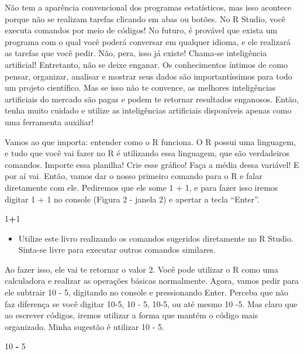 \documentclass[
]{book}
\newenvironment{Shaded}{\begin{snugshade}}{\end{snugshade}}
\newcommand{\DecValTok}[1]{\textcolor[rgb]{0.00,0.00,0.81}{#1}}
\newcommand{\SpecialCharTok}[1]{\textcolor[rgb]{0.81,0.36,0.00}{\textbf{#1}}}
\providecommand{\tightlist}{%
  \setlength{\itemsep}{0pt}\setlength{\parskip}{0pt}}
\begin{document}
Não tem a aparência convencional dos programas estatísticos, mas isso acontece porque não se realizam tarefas clicando em abas ou botões. No R Studio, você executa comandos por meio de códigos! No futuro, é provável que exista um programa com o qual você poderá conversar em qualquer idioma, e ele realizará as tarefas que você pedir. Não, pera, isso já existe! Chama-se inteligência artificial! Entretanto, não se deixe enganar. Os conhecimentos íntimos de como pensar, organizar, analisar e mostrar seus dados são importantíssimos para todo um projeto científico. Mas se isso não te convence, as melhores inteligências artificiais do mercado são pagas e podem te retornar resultados enganosos. Então, tenha muito cuidado e utilize as inteligências artificiais disponíveis apenas como uma ferramenta auxiliar!

Vamos ao que importa: entender como o R funciona. O R possui uma linguagem, e tudo que você vai fazer no R é utilizando essa linguagem, que são verdadeiros comandos. Importe essa planilha! Crie esse gráfico! Faça a média dessa variável! E por aí vai. Então, vamos dar o nosso primeiro comando para o R e falar diretamente com ele. Pediremos que ele some 1 + 1, e para fazer isso iremos digitar 1 + 1 no console (Figura 2 - janela 2) e apertar a tecla ``Enter''.

\begin{Shaded}
\begin{Highlighting}[]
\DecValTok{1}\SpecialCharTok{+}\DecValTok{1}
\end{Highlighting}
\end{Shaded}

\begin{itemize}
\tightlist
\item
  Utilize este livro realizando os comandos sugeridos diretamente no R Studio. Sinta-se livre para executar outros comandos similares.
\end{itemize}

Ao fazer isso, ele vai te retornar o valor 2. Você pode utilizar o R como uma calculadora e realizar as operações básicas normalmente. Agora, vamos pedir para ele subtrair 10 - 5, digitando no console e pressionando Enter. Perceba que não faz diferença se você digitar 10-5, 10 - 5, 10-5, ou até mesmo 10 -5. Mas claro que ao escrever códigos, iremos utilizar a forma que mantém o código mais organizado. Minha sugestão é utilizar 10 - 5.

\begin{Shaded}
\begin{Highlighting}[]
\DecValTok{10} \SpecialCharTok{{-}} \DecValTok{5}
\end{Highlighting}
\end{Shaded}
\end{document}
